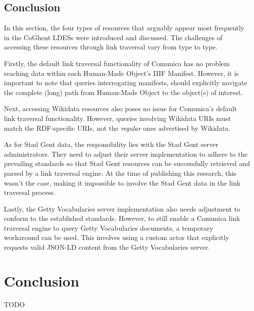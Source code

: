 \subsection{Conclusion}

In this section, the four types of resources that arguably appear most frequently in the CoGhent LDESs were introduced and discussed. The challenges of accessing these resources through link traversal vary from type to type.

Firstly, the default link traversal functionality of Comunica has no problem reaching data within each Human-Made Object's IIIF Manifest. However, it is important to note that queries interrogating manifests, should explicitly navigate the complete (long) path from Human-Made Object to the object(s) of interest.

Next, accessing Wikidata resources also poses no issue for Comunica's default link traversal functionality. However, queries involving Wikidata URIs must match the RDF-specific URIs, not the \textit{regular} ones advertised by Wikidata.

As for Stad Gent data, the responsibility lies with the Stad Gent server administrators. They need to adjust their server implementation to adhere to the prevailing standards so that Stad Gent resources can be successfully retrieved and parsed by a link traversal engine. At the time of publishing this research, this wasn't the case, making it impossible to involve the Stad Gent data in the link traversal process.

Lastly, the Getty Vocabularies server implementation also needs adjustment to conform to the established standards. However, to still enable a Comunica link traversal engine to query Getty Vocabularies documents, a temporary workaround can be used. This involves using a custom actor that explicitly requests valid JSON-LD content from the Getty Vocabularies server.

\section{Conclusion}
\label{sec:coghent_link_traversal_conclusion}

TODO